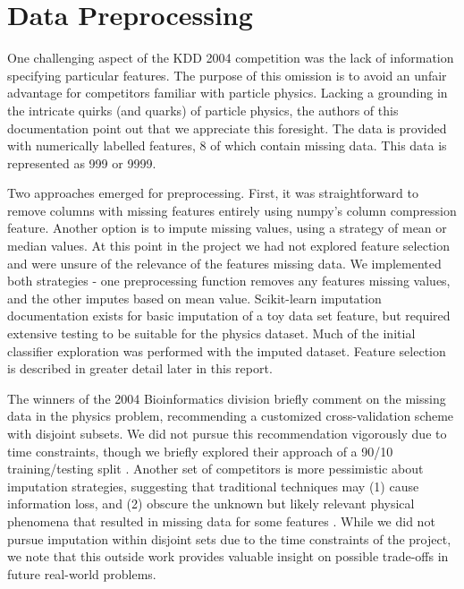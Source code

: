 \documentclass{article}
\begin{document}


\section{Data Preprocessing}

One challenging aspect of the KDD 2004 competition was the lack of information specifying particular features.
The purpose of this omission is to avoid an unfair advantage for competitors familiar with particle physics.
Lacking a grounding in the intricate quirks (and quarks) of particle physics, the authors of this documentation point out that we appreciate this foresight.
The data is provided with numerically labelled features, 8 of which contain missing data.
This data is represented as 999 or 9999.

Two approaches emerged for preprocessing.
First, it was straightforward to remove columns with missing features entirely using numpy's column compression feature.
Another option is to impute missing values, using a strategy of mean or median values.
At this point in the project we had not explored feature selection and were unsure of the relevance of the features missing data.
We implemented both strategies - one preprocessing function removes any features missing values, and the other imputes based on mean value.
Scikit-learn imputation documentation exists for basic imputation of a toy data set feature, but required extensive testing to be suitable for the physics dataset.
Much of the initial classifier exploration was performed with the imputed dataset.
Feature selection is described in greater detail later in this report.

The winners of the 2004 Bioinformatics division briefly comment on the missing data in the physics problem, recommending a customized cross-validation scheme with disjoint subsets. 
We did not pursue this recommendation vigorously due to time constraints, though we briefly explored their approach of a 90/10 training/testing split \cite{pfahringer2004weka}.
Another set of competitors is more pessimistic about imputation strategies, suggesting that traditional techniques may (1) cause information loss, and (2) obscure the unknown but likely relevant physical phenomena that resulted in missing data for some features \cite{vogel2004anti}.
While we did not pursue imputation within disjoint sets due to the time constraints of the project, we note that this outside work provides valuable insight on possible trade-offs in future real-world problems.
\end{document}
